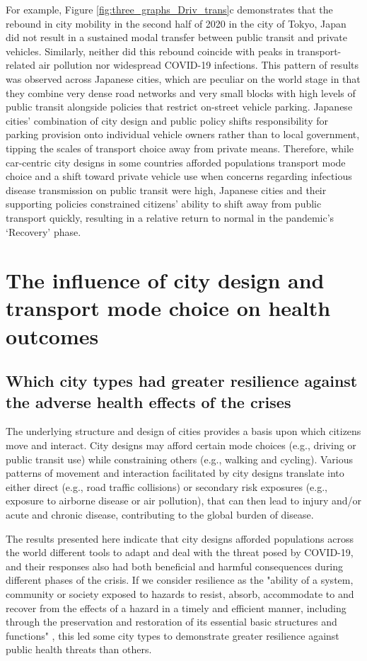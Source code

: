 \documentclass[preprint,10pt]{elsarticle} %
\begin{document}
For example, Figure \ref{fig:three_graphs_Driv_trans}c demonstrates that the rebound in city mobility in the second half of 2020 in the city of Tokyo, Japan did not result in a sustained modal transfer between public transit and private vehicles. Similarly, neither did this rebound coincide with peaks in transport-related air pollution nor widespread COVID-19 infections. This pattern of results was observed across Japanese cities, which are peculiar on the world stage in that they combine very dense road networks and very small blocks with high levels of public transit alongside policies that restrict on-street vehicle parking\cite{clements2019socialising}. Japanese cities' combination of city design and public policy shifts responsibility for parking provision onto individual vehicle owners rather than to local government, tipping the scales of transport choice away from private means. Therefore, while car-centric city designs in some countries afforded populations transport mode choice and a shift toward private vehicle use when concerns regarding infectious disease transmission on public transit were high, Japanese cities and their supporting policies constrained citizens' ability to shift away from public transport quickly, resulting in a relative return to normal in the pandemic's `Recovery' phase.


\section*{\textcolor{OliveGreen}{The influence of city design and transport mode choice on health outcomes}}
\subsection*{Which city types had greater resilience against the adverse health effects of the crises}
The underlying structure and design of cities provides a basis upon which citizens move and interact. City designs may afford certain mode choices (e.g., driving or public transit use) while constraining others (e.g., walking and cycling). Various patterns of movement and interaction facilitated by city designs translate into either direct (e.g., road traffic collisions) or secondary risk exposures (e.g., exposure to airborne disease or air pollution), that can then lead to injury and/or acute and chronic disease, contributing to the global burden of disease.

The results presented here indicate that city designs afforded populations across the world different tools to adapt and deal with the threat posed by COVID-19, and their responses also had both beneficial and harmful consequences during different phases of the crisis. If we consider resilience as the "ability of a system, community or society exposed to hazards to resist, absorb, accommodate to and recover from the effects of a hazard in a timely and efficient manner, including through the preservation and restoration of its essential basic structures and functions" \cite{unisdr2009terminology}, this led some city types to demonstrate greater resilience against public health threats than others.
\end{document}
